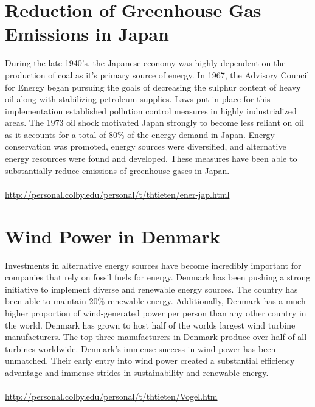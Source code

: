\documentclass{article}
\begin{document}
\begin{spacing}{2.15}
    \section{Reduction of Greenhouse Gas Emissions in Japan}
    \indent During the late 1940's, the Japanese economy was highly dependent on the production of coal as it's primary source of energy. In 1967, the Advisory Council for Energy began pursuing the goals of decreasing the sulphur content of heavy oil along with stabilizing petroleum supplies. Laws put in place for this implementation established pollution control measures in highly industrialized areas. The 1973 oil shock motivated Japan strongly to become less reliant on oil as it accounts for a total of 80\% of the energy demand in Japan. Energy conservation was promoted, energy sources were diversified, and alternative energy resources were found and developed. These measures have been able to substantially reduce emissions of greenhouse gases in Japan.\\\\
    \url{http://personal.colby.edu/personal/t/thtieten/ener-jap.html}
    \newpage
    \section{Wind Power in Denmark}
    \indent Investments in alternative energy sources have become incredibly important for companies that rely on fossil fuels for energy. Denmark has been pushing a strong initiative to implement diverse and renewable energy sources. The country has been able to maintain 20\% renewable energy. Additionally, Denmark has a much higher proportion of wind-generated power per person than any other country in the world. Denmark has grown to host half of the worlds largest wind turbine manufacturers. The top three manufacturers in Denmark produce over half of all turbines worldwide. Denmark's immense success in wind power has been unmatched. Their early entry into wind power created a substantial efficiency advantage and immense strides in sustainability and renewable energy. \\\\
    \url{http://personal.colby.edu/personal/t/thtieten/Vogel.htm}

\end{spacing}
\end{document}
